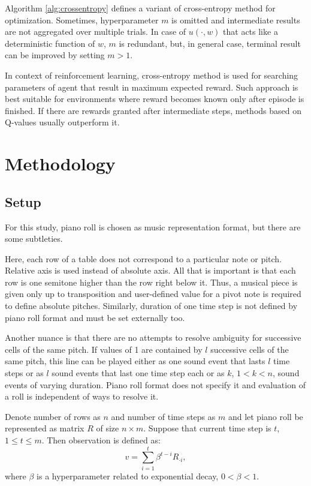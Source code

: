 \documentclass{article}
\begin{document}
Algorithm \ref{alg:crossentropy} defines a variant of cross-entropy method for optimization. Sometimes, hyperparameter $m$ is omitted and intermediate results are not aggregated over multiple trials. In case of $u(\cdot, w)$ that acts like a deterministic function of $w$, $m$ is redundant, but, in general case, terminal result can be improved by setting $m > 1$.

In context of reinforcement learning, cross-entropy method is used for searching parameters of agent that result in maximum expected reward. Such approach is best suitable for environments where reward becomes known only after episode is finished. If there are rewards granted after intermediate steps, methods based on Q-values usually outperform it.


\section{Methodology}
\label{sec:methodology}

\subsection{Setup}
\label{subsec:setup}

For this study, piano roll is chosen as music representation format, but there are some subtleties.

Here, each row of a table does not correspond to a particular note or pitch. Relative axis is used instead of absolute axis. All that is important is that each row is one semitone higher than the row right below it. Thus, a musical piece is given only up to transposition and user-defined value for a pivot note is required to define absolute pitches. Similarly, duration of one time step is not defined by piano roll format and must be set externally too.

Another nuance is that there are no attempts to resolve ambiguity for successive cells of the same pitch. If values of 1 are contained by $l$ successive cells of the same pitch, this line can be played either as one sound event that lasts $l$ time steps or as $l$ sound events that last one time step each or as $k$, $1 < k < n$, sound events of varying duration. Piano roll format does not specify it and evaluation of a roll is independent of ways to resolve it.

Denote number of rows as $n$ and number of time steps as $m$ and let piano roll be represented as matrix $R$ of size $n \times m$. Suppose that current time step is $t$, $1 \le t \le m$. Then observation is defined as:
$$v = \sum_{i = 1}^t \beta^{t - i} R_{\cdot i},$$
where $\beta$ is a hyperparameter related to exponential decay, $0 < \beta < 1$.
\end{document}
